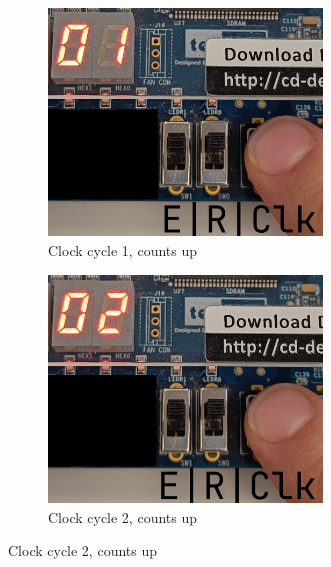 \documentclass{article}
\begin{document}
\begin{figure}[h]
    \begin{subfigure}[t]{0.45\textwidth}
        \centering
        \includegraphics[width=0.8\textwidth]{Figures/Part1_3.jpg}
        \caption{Clock cycle 1, counts up}
        \label{fig:p1_3}
    \end{subfigure}
    \hfill
    \begin{subfigure}[t]{0.45\textwidth}
        \centering
        \includegraphics[width=0.8\textwidth]{Figures/Part1_4.jpg}
        \caption{Clock cycle 2, counts up}
        \label{fig:p1_4}
    \end{subfigure}


\end{figure}
\end{document}
